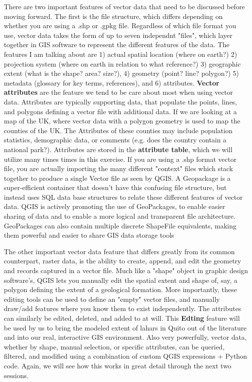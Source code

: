 \documentclass{article}
\begin{document}
There are two important features of vector data that need to be discussed before moving forward. The first is the file structure, which differs depending on whether you are using a .shp or .gpkg file. Regardless of which file format you use, vector data takes the form of up to seven independnt "files", which layer together in GIS software to represent the different features of the data. The features I am talking about are 1) actual spatial location (where on earth?) 2) projection system (where on earth in relation to what reference?) 3) geographic extent (what is the shape? area? size?), 4) geometry (point? line? polygon?) 5) metadata (glossary for key terms, references), and 6) attributes. \textbf{Vector attributes} are the feature we tend to be care about most when using vector data. Attributes are typically supporting data, that populate the points, lines, and polygons defining a vector file with additional data. If we are looking at a map of the UK, where vector data with a polygon geometry is used to map the counties of the UK. The Attributes of these counties may include population statistics, demographic data, or comments (e.g. does the country contain a national park?). Attributes are stored in the \textbf{attribute table}, which we will utilize many times times in this exercise. If you are using a .shp format vector file, you are actually importing the many different "context" files which stack together to produce a single Vector file as seen by QGIS. A Geopackage is a super-efficient container that doesn't have this confusing file structure, but instead uses SQL data base structures to relate these different features of vector data. QGIS is actively promoting the use of GeoPackages, to enable easier sharing of data and to enable a more logical and transparent file architecture. GeoPackages can also contain multiple discrete ShapeFile equivalents, making them powerful and easier to share GIS data storage tools 

The other important vector data feature that differs greatly from its common counterpart, raster data, is the ability to create, append, and edit the geometry and records captured in a vector file. Much like a "shape" object in graphic design software's, QGIS lets you manually edit the spatial extent and shape of, say, a polygon defining the extent of a geological formation. More importantly, these editing tools can be used to define an "empty" vector files, and manually draw/add features where you know them to exist independently. The attributes can similarly be edited, deleted, and added to at will. This \textbf{Edting} feature will be used by us to bring the modeled extent of lahars in Quito out of the literature and into our real, interactive GIS environment. Also very powerfully, vector data, whether by shape, manual selection, or specific attributes, can be queried, filtered, and modified using a combination of custom QGIS expressions + Python code. Again, we will see how this works in great detail through the next two sessions. 
\end{document}
